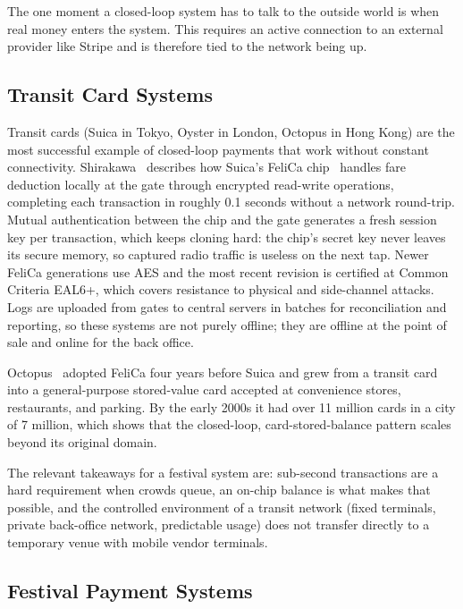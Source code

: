 The one moment a closed-loop system has to talk to the outside world is when real money enters the system. This requires an active connection to an external provider like Stripe and is therefore tied to the network being up.

\subsection{Transit Card Systems}
\label{subsec:transit-cards}

Transit cards (Suica in Tokyo, Oyster in London, Octopus in Hong Kong) are the most successful example of closed-loop payments that work without constant connectivity. Shirakawa~\cite{Shirakawa2002} describes how Suica's FeliCa chip~\cite{SonyFeliCa} handles fare deduction locally at the gate through encrypted read-write operations, completing each transaction in roughly 0.1 seconds without a network round-trip. Mutual authentication between the chip and the gate generates a fresh session key per transaction, which keeps cloning hard: the chip's secret key never leaves its secure memory, so captured radio traffic is useless on the next tap. Newer FeliCa generations use AES and the most recent revision is certified at Common Criteria EAL6+, which covers resistance to physical and side-channel attacks. Logs are uploaded from gates to central servers in batches for reconciliation and reporting, so these systems are not purely offline; they are offline at the point of sale and online for the back office.

Octopus~\cite{SonyOctopus, Chau2003} adopted FeliCa four years before Suica and grew from a transit card into a general-purpose stored-value card accepted at convenience stores, restaurants, and parking. By the early 2000s it had over 11 million cards in a city of 7 million, which shows that the closed-loop, card-stored-balance pattern scales beyond its original domain.

The relevant takeaways for a festival system are: sub-second transactions are a hard requirement when crowds queue, an on-chip balance is what makes that possible, and the controlled environment of a transit network (fixed terminals, private back-office network, predictable usage) does not transfer directly to a temporary venue with mobile vendor terminals.

\subsection{Festival Payment Systems}
\label{subsec:campus-cards}

